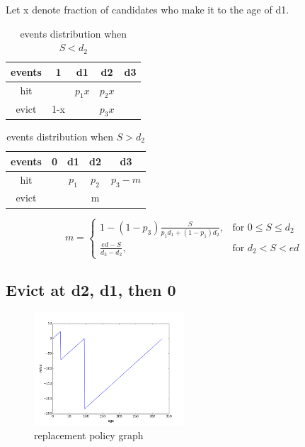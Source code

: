 \documentclass[12pt, letterpaper]{article}
\begin{document}
Let x denote fraction of candidates who make it to the age of d1.

\begin{table}[H]
\begin{center}
\begin{tabular}{c | c c c c}
\hline
events & 1 & d1 & d2 & d3 \\
\hline
hit & & $p_1 x$ & $p_2 x$ &  \\
evict & 1-x & & $p_3 x$ & 
\end{tabular}
\caption{events distribution when $S<d_2$}
\end{center}
\end{table}


\begin{table}[H]
\begin{center}
\begin{tabular}{c | c c c c}
\hline
events & 0 & d1 & d2 & d3 \\
\hline
hit & & $p_1$ & $p_2$ & $p_3-m$ \\
evict & & & m & 
\end{tabular}
\caption{events distribution when $S > d_2$}
\end{center}
\end{table}

\[
m = \left\{\begin{array}{lr}
      1-(1-p_3) \frac{S}{p_1 d_1 + (1-p_1) d_2}, & \text{for } 0 \leq S \leq d_2 \\
      \frac{ed-S}{d_3-d_2}, & \text{for } d_2 < S < ed
           \end{array}
           \right.
\]

\subsection{Evict at d2, d1, then 0}

\begin{figure}[H]
\centering
\includegraphics[width=0.5\textwidth]{evict_d2_d1.png}
\caption{replacement policy graph}
\end{figure}
\end{document}
